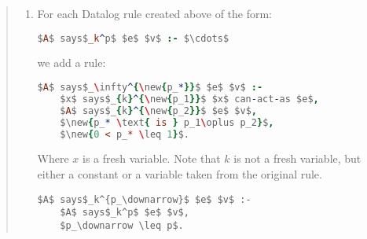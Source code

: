 \begin{quotation}
\begin{enumerate}
  Then the assertion \lstinline!$A$ says $f_0$ if $f_1\cdots f_m$, c, with plausibility $p$! is translated into a set of $n+1$ Datalog rules as follows.
  
  \begin{enumerate}
  \item 
    We add the Datalog rule:
    \begin{lstlisting}[language=Prolog]
$A$ says$_k^{\new{p_*}}$ $f^\prime_0$ :-
    $x$ says$_k^{\new{p_1}}$ $f_1\cdots$ $A$ says$_k^{\new{p_m}}$ $f_m$, c,
    $\new{p_\Sigma \text{ is } p_1 \oplus \cdots \oplus p_n}$, 
    $\new{0 < p_{lim} \leq p_\Sigma}$.
    \end{lstlisting}
    Where $k$ is a fresh variable, .

  \item
    For each $i\in\left\{1\cdots n\right\}$, we add a Datalog rule
    \begin{lstlisting}[language=Prolog]
$A$ says$_\infty^{\new{p_*}}$ $f^\prime_i$ :-
    $x$ says$_{D_{i-1}}^{\new{p_1}}$ $f^\prime_i$,
    $A$ says$_{\infty}^{\new{p_2}}$ $x$ can-say $D_{i-1}$ $f^\prime_i$,
    $\new{p_* \text{ is } p_1\oplus p_2}$, 
    $\new{0 < p_* \leq 1}$.
    \end{lstlisting}
    Where $x$ is a fresh variable.
  \end{enumerate}
  
  \item
    For each Datalog rule created above of the form:
    \begin{lstlisting}[language=Prolog]
      $A$ says$_k^p$ $e$ $v$ :- $\cdots$
    \end{lstlisting}
    we add a rule:

    \begin{lstlisting}[language=Prolog]
$A$ says$_\infty^{\new{p_*}}$ $e$ $v$ :-
    $x$ says$_{k}^{\new{p_1}}$ $x$ can-act-as $e$,
    $A$ says$_{k}^{\new{p_2}}$ $e$ $v$,
    $\new{p_* \text{ is } p_1\oplus p_2}$, 
    $\new{0 < p_* \leq 1}$.
    \end{lstlisting} Where $x$ is a fresh variable.  Note that $k$ is
not a fresh variable, but either a constant or a variable taken from
the original rule.
    

      
      \begin{lstlisting}[basicstyle=\color{BrickRed}\ttfamily]
$A$ says$_k^{p_\downarrow}$ $e$ $v$ :- 
    $A$ says$_k^p$ $e$ $v$,
    $p_\downarrow \leq p$.
      \end{lstlisting}
\end{enumerate}
\end{quotation}
